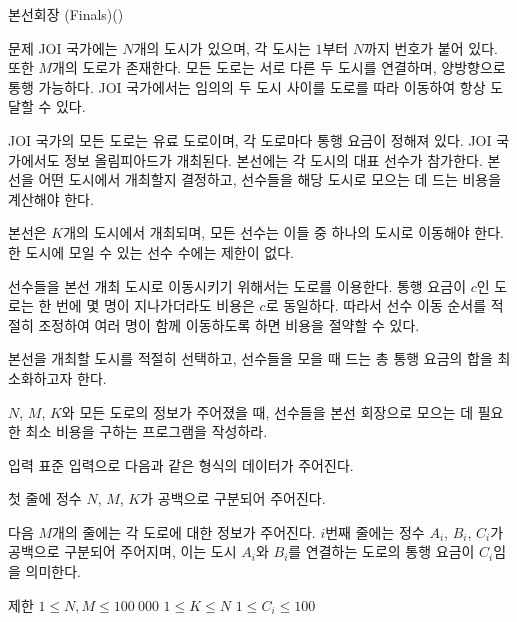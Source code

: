 
\begin{frame}[label=p2]{본선회장 (Finals)(\prob)}
\tiny

\begin{block}{문제}
JOI 국가에는 $N$개의 도시가 있으며, 각 도시는 $1$부터 $N$까지 번호가 붙어 있다. 또한 $M$개의 도로가 존재한다. 모든 도로는 서로 다른 두 도시를 연결하며, 양방향으로 통행 가능하다. JOI 국가에서는 임의의 두 도시 사이를 도로를 따라 이동하여 항상 도달할 수 있다.

JOI 국가의 모든 도로는 유료 도로이며, 각 도로마다 통행 요금이 정해져 있다. JOI 국가에서도 정보 올림피아드가 개최된다. 본선에는 각 도시의 대표 선수가 참가한다. 본선을 어떤 도시에서 개최할지 결정하고, 선수들을 해당 도시로 모으는 데 드는 비용을 계산해야 한다.

본선은 $K$개의 도시에서 개최되며, 모든 선수는 이들 중 하나의 도시로 이동해야 한다. 한 도시에 모일 수 있는 선수 수에는 제한이 없다.

선수들을 본선 개최 도시로 이동시키기 위해서는 도로를 이용한다. 통행 요금이 $c$인 도로는 한 번에 몇 명이 지나가더라도 비용은 $c$로 동일하다. 따라서 선수 이동 순서를 적절히 조정하여 여러 명이 함께 이동하도록 하면 비용을 절약할 수 있다.

본선을 개최할 도시를 적절히 선택하고, 선수들을 모을 때 드는 총 통행 요금의 합을 최소화하고자 한다.

$N$, $M$, $K$와 모든 도로의 정보가 주어졌을 때, 선수들을 본선 회장으로 모으는 데 필요한 최소 비용을 구하는 프로그램을 작성하라.
\end{block}

\begin{block}{입력}
표준 입력으로 다음과 같은 형식의 데이터가 주어진다.

첫 줄에 정수 $N$, $M$, $K$가 공백으로 구분되어 주어진다.

다음 $M$개의 줄에는 각 도로에 대한 정보가 주어진다.  
$i$번째 줄에는 정수 $A_i$, $B_i$, $C_i$가 공백으로 구분되어 주어지며, 이는 도시 $A_i$와 $B_i$를 연결하는 도로의 통행 요금이 $C_i$임을 의미한다.
\end{block}

\begin{block}{제한}
$1 \le N, M \le 100\ 000$
$1 \le K \le N$
$1 \le C_i \le 100$
\end{block}

\end{frame}

